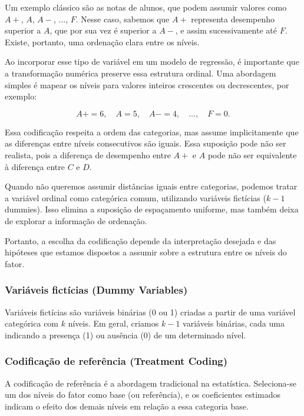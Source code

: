 \documentclass{article}
\begin{document}
Um exemplo clássico são as notas de alunos, que podem assumir valores como
$A+$, $A$, $A-$, $\dots$, $F$. Nesse caso, sabemos que $A+$ representa
desempenho superior a $A$, que por sua vez é superior a $A-$, e assim
sucessivamente até $F$. Existe, portanto, uma ordenação clara entre os níveis.

Ao incorporar esse tipo de variável em um modelo de regressão, é importante
que a transformação numérica preserve essa estrutura ordinal. Uma abordagem
simples é mapear os níveis para valores inteiros crescentes ou decrescentes,
por exemplo:

\[
A+ = 6, \quad A = 5, \quad A- = 4, \quad \dots, \quad F = 0.
\]

Essa codificação respeita a ordem das categorias, mas assume implicitamente
que as diferenças entre níveis consecutivos são iguais. Essa suposição pode
não ser realista, pois a diferença de desempenho entre $A+$ e $A$ pode não
ser equivalente à diferença entre $C$ e $D$.

Quando não queremos assumir distâncias iguais entre categorias,
podemos tratar a variável ordinal como categórica comum,
utilizando variáveis fictícias ($k - 1$ dummies). Isso elimina
a suposição de espaçamento uniforme, mas também deixa de explorar
a informação de ordenação.

Portanto, a escolha da codificação depende da interpretação desejada
e das hipóteses que estamos dispostos a assumir sobre a estrutura
entre os níveis do fator.

\subsubsection{Variáveis fictícias (Dummy Variables)}

Variáveis fictícias são variáveis binárias (0 ou 1) criadas a partir de uma
variável categórica com $k$ níveis. Em geral, criamos $k - 1$ variáveis binárias,
cada uma indicando a presença (1) ou ausência (0) de um determinado nível.

\subsubsection{Codificação de referência (Treatment Coding)}

A codificação de referência é a abordagem tradicional na estatística.
Seleciona-se um dos níveis do fator como base (ou referência), e os coeficientes
estimados indicam o efeito dos demais níveis em relação a essa categoria base.
\end{document}

